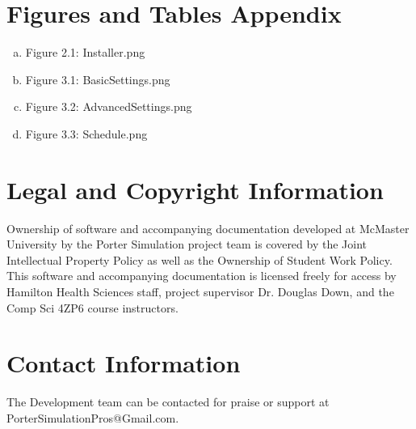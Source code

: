 \documentclass[paper=letter, fontsize=10pt]{scrartcl}
\numberwithin{equation}{section}		%
\numberwithin{figure}{section}			%
\numberwithin{table}{section}				%
\begin{document}
\section{Figures and Tables Appendix}
\begin{enumerate}[(a)]
	\item Figure 2.1: Installer.png
	\item Figure 3.1: BasicSettings.png
	\item Figure 3.2: AdvancedSettings.png
	\item Figure 3.3: Schedule.png
\end{enumerate}

\section{Legal and Copyright Information}
Ownership of software and accompanying documentation developed at McMaster University by the Porter Simulation project team is covered by the Joint Intellectual Property Policy as well as the Ownership of Student Work Policy. This software and accompanying documentation is licensed freely for access by Hamilton Health Sciences staff, project supervisor Dr. Douglas Down, and the Comp Sci 4ZP6 course instructors.

\section{Contact Information}
The Development team can be contacted for praise or support at PorterSimulationPros@Gmail.com.



\end{document}
